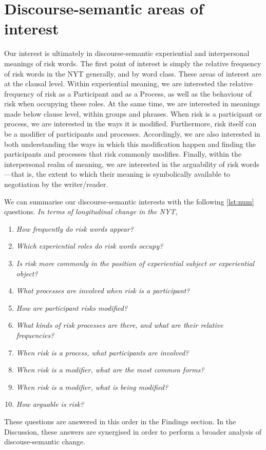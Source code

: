 			\section{Discourse-semantic areas of interest}

				Our interest is ultimately in discourse-semantic experiential and interpersonal meanings of risk words. The first point of interest is simply the relative frequency of risk words in the NYT generally, and by word class. These areas of interest are at the clausal level. Within experiential meaning, we are interested the relative frequency of risk as a Participant and as a Process, as well as the behaviour of risk when occupying these roles. At the same time, we are interested in meanings made below clause level, within groups and phrases. When risk is a participant or process, we are interested in the ways it is modified. Furthermore, risk itself can be a modifier of participants and processes. Accordingly, we are also interested in both understanding the ways in which this modification happen and finding the participants and processes that risk commonly modifies. Finally, within the interpersonal realm of meaning, we are interested in the arguability of risk words---that is, the extent to which their meaning is symbolically available to negotiation by the writer/reader.

				We can summarise our discourse-semantic interests with the following \ref{lst:num} questions. \emph{In terms of longitudinal change in the NYT,}

				\begin{enumerate}\setlength\itemsep{-0.5em}
					\item \emph{How frequently do risk words appear?}
					\item \emph{Which experiential roles do risk words occupy?}
					\item \emph{Is risk more commonly in the position of experiential subject or experiential object?}
					\item \emph{What processes are involved when risk is a participant?}
					\item \emph{How are participant risks modified?}
					\item \emph{What kinds of risk processes are there, and what are their relative frequencies?}
					\item \emph{When risk is a process, what participants are involved?}
					\item \emph{When risk is a modifier, what are the most common forms?}
					\item \emph{When risk is a modifier, what is being modified?}
					\item \emph{How arguable is risk?} \label{lst:num}
				\end{enumerate}
				These questions are answered in this order in the Findings section. In the Discussion, these answers are synergised in order to perform a broader analysis of discouse-semantic change.

